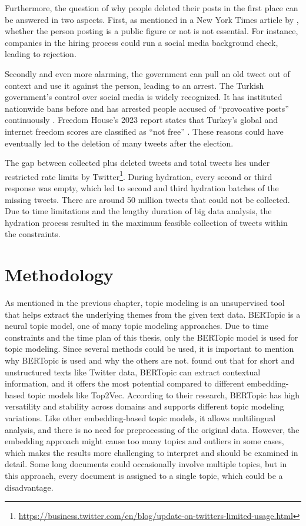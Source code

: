 Furthermore, the question of why people deleted their posts in the first place 
can be answered in two aspects. First, as mentioned in a New York Times article 
by \textcite{klosowski_delete_tweets_2022}, whether the person posting is a public figure 
or not is not essential. For instance, companies in the hiring process could run a social media 
background check, leading to rejection. 

Secondly and even more alarming, the government can pull 
an old tweet out of context and use it against the person, leading to an arrest. 
The Turkish government's control over social media is widely recognized. 
It has instituted nationwide bans before and has arrested people accused of 
``provocative posts'' continuously \parencite{scott_turkey_social_media_ban_2023}.
Freedom House's 2023 report states that Turkey's global and internet freedom scores are 
classified as ``not free'' \parencite{freedom-house_turkey_report}. 
These reasons could have eventually led to the deletion of many tweets 
after the election.

The gap between collected plus deleted tweets and total tweets lies under restricted 
rate limits by Twitter\footnote{\url{https://business.twitter.com/en/blog/update-on-twitters-limited-usage.html}}. 
During hydration, every second or third response was empty, which led to second 
and third hydration batches of the missing tweets. There are around 50 million tweets
that could not be collected. Due to time limitations 
and the lengthy duration of big data analysis, the hydration process resulted in the 
maximum feasible collection of tweets within the constraints.

\section{Methodology}

As mentioned in the previous chapter, topic modeling is an unsupervised tool that helps 
extract the underlying themes from the given text data. BERTopic is a neural topic model, 
one of many topic modeling approaches.
Due to time constraints and the time plan of this thesis, only the BERTopic model 
is used for topic modeling. Since several methods could be used, it is important 
to mention why BERTopic is used and why the others are not.
\textcite{topic_model_comparison_bertopic_2022} found out that for short and 
unstructured texts like Twitter data, BERTopic can extract contextual information, 
and it offers the most potential compared to different embedding-based topic models like Top2Vec.
According to their research, BERTopic has high versatility and stability across 
domains and supports different topic modeling variations. Like other embedding-based 
topic models, it allows multilingual analysis, and there is no need for 
preprocessing of the original data. However, the embedding approach might cause 
too many topics and outliers in some cases, which makes the results more 
challenging to interpret and should be examined in detail. 
Some long documents could occasionally involve multiple topics, but in this 
approach, every document is assigned to a single topic, which could be a 
disadvantage.

